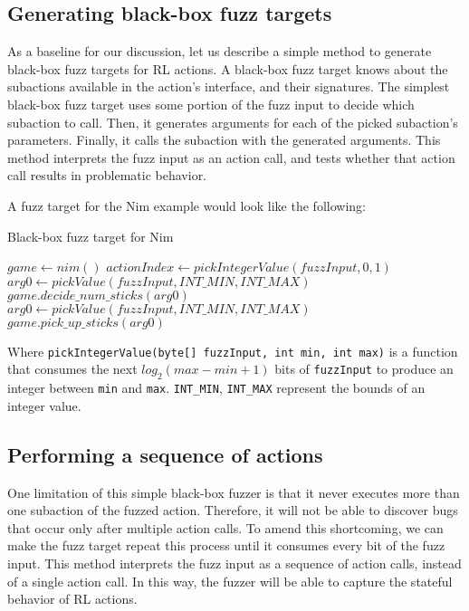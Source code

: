 \subsection{Generating black-box fuzz targets} \label{blackboxFuzzTargets}
As a baseline for our discussion, let us describe a simple method to generate black-box fuzz targets for RL actions.
A black-box fuzz target knows about the subactions available in the action's interface, and their signatures.
The simplest black-box fuzz target uses some portion of the fuzz input to decide which subaction to call.
Then, it generates arguments for each of the picked subaction's parameters.
Finally, it calls the subaction with the generated arguments.
This method interprets the fuzz input as an action call, and tests whether that action call results in problematic behavior.

A fuzz target for the Nim example would look like the following:
\begin{algorithm}[H]
    \caption{Black-box fuzz target for Nim}
    \begin{algorithmic}[1]
    \STATE $game \gets nim()$
    \STATE $actionIndex \gets pickIntegerValue(fuzzInput, 0, 1)$
        \STATE $arg0 \gets pickValue(fuzzInput, INT\_MIN, INT\_MAX)$
        \STATE $game.decide\_num\_sticks(arg0)$
    \ENDIF
        \STATE $arg0 \gets pickValue(fuzzInput, INT\_MIN, INT\_MAX)$
        \STATE $game.pick\_up\_sticks(arg0)$
    \ENDIF
    \end{algorithmic}
\end{algorithm}
Where \texttt{pickIntegerValue(byte[] fuzzInput, int min, int max)} is a function that consumes the next $log_2(max - min + 1)$ bits of \texttt{fuzzInput}
 to produce an integer between \texttt{min} and \texttt{max}.
 \texttt{INT\_MIN}, \texttt{INT\_MAX} represent the bounds of an integer value.

\subsection{Performing a sequence of actions}
One limitation of this simple black-box fuzzer is that it never executes more than one subaction of the fuzzed action.
Therefore, it will not be able to discover bugs that occur only after multiple action calls.
To amend this shortcoming, we can make the fuzz target repeat this process until it consumes every bit of the fuzz input.
This method interprets the fuzz input as a sequence of action calls, instead of a single action call.
In this way, the fuzzer will be able to capture the stateful behavior of RL actions.

